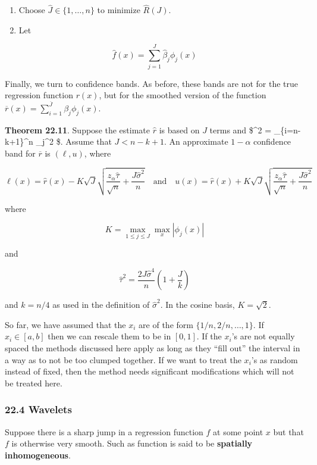 \begin{enumerate}
\def\labelenumi{\arabic{enumi}.}
\setcounter{enumi}{3}
\item
  Choose \(\hat{J} \in \{1, \dots, n \}\) to minimize \(\hat{R}(J)\).
\item
  Let
\end{enumerate}

\[ \hat{f}(x) = \sum_{j=1}^J \hat{\beta}_j \phi_j(x) \]

Finally, we turn to confidence bands. As before, these bands are not for
the true regression function \(r(x)\), but for the smoothed version of
the function
\(\overline{r}(x) = \sum_{i=1}^\overline{J} \beta_j \phi_j(x)\).

\textbf{Theorem 22.11}. Suppose the estimate \(\hat{r}\) is based on
\(J\) terms and \$\hat{\sigma}\^{}2 =  \sum\_\{i=n-k+1\}\^{}n
\hat{\beta}\_j\^{}2 \$. Assume that \(J < n - k + 1\). An approximate
\(1 - \alpha\) confidence band for \(\overline{r}\) is \((\ell, u)\),
where

\[ \ell(x) = \hat{r}(x) - K \sqrt{J} \sqrt{\frac{z_{\alpha} \hat{\tau}}{\sqrt{n}} + \frac{J \hat{\sigma}^2}{n}}
\quad \text{and} \quad u(x) = \hat{r}(x) + K \sqrt{J} \sqrt{\frac{z_{\alpha} \hat{\tau}}{\sqrt{n}} + \frac{J \hat{\sigma}^2}{n}} \]

where

\[ K = \max_{1 \leq j \leq J} \max_x | \phi_j(x) | \]

and

\[ \hat{\tau}^2 = \frac{2 J \hat{\sigma}^4}{n} \left( 1 + \frac{J}{k} \right) \]

and \(k = n / 4\) as used in the definition of \(\hat{\sigma}^2\). In
the cosine basis, \(K = \sqrt{2}\).

So far, we have assumed that the \(x_i\) are of the form
\(\{1/n, 2/n, \dots, 1\}\). If \(x_i \in [a, b]\) then we can rescale
them to be in \([0, 1]\). If the \(x_i\)'s are not equally spaced the
methods discussed here apply as long as they ``fill out'' the interval
in a way as to not be too clumped together. If we want to treat the
\(x_i\)'s as random instead of fixed, then the method needs significant
modifications which will not be treated here.

\subsubsection{22.4 Wavelets}\label{wavelets}

Suppose there is a sharp jump in a regression function \(f\) at some
point \(x\) but that \(f\) is otherwise very smooth. Such as function is
said to be \textbf{spatially inhomogeneous}.

